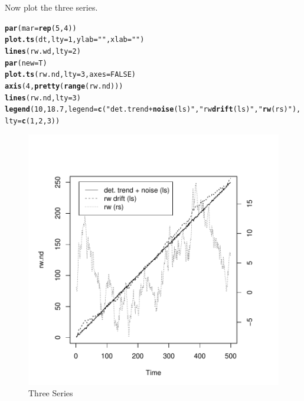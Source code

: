 \documentclass{article}\usepackage{graphicx, color}
\makeatletter
\def\maxwidth{ %
  \ifdim\Gin@nat@width>\linewidth
    \linewidth
  \else
    \Gin@nat@width
  \fi
}
\newcommand{\hlfunctioncall}[1]{\textcolor[rgb]{0.501960784313725,0,0.329411764705882}{\textbf{#1}}}%
\newcommand{\hlstring}[1]{\textcolor[rgb]{0.6,0.6,1}{#1}}%
\newenvironment{kframe}{%
 \def\at@end@of@kframe{}%
 \ifinner\ifhmode%
  \def\at@end@of@kframe{\end{minipage}}%
  \begin{minipage}{\columnwidth}%
 \fi\fi%
 \def\FrameCommand##1{\hskip\@totalleftmargin \hskip-\fboxsep
 \colorbox{shadecolor}{##1}\hskip-\fboxsep
     \hskip-\linewidth \hskip-\@totalleftmargin \hskip\columnwidth}%
 \MakeFramed {\advance\hsize-\width
   \@totalleftmargin\z@ \linewidth\hsize
   \@setminipage}}%
 {\par\unskip\endMakeFramed%
 \at@end@of@kframe}
\newenvironment{knitrout}{}{} %
\makeatother
\begin{document}
Now plot the three series. 
\begin{knitrout}
\color{fgcolor}\begin{kframe}
\begin{alltt}
\hlfunctioncall{par}(mar = \hlfunctioncall{rep}(5, 4))
\hlfunctioncall{plot.ts}(dt, lty = 1, ylab = \hlstring{""}, xlab = \hlstring{""})
\hlfunctioncall{lines}(rw.wd, lty = 2)
\hlfunctioncall{par}(new = T)
\hlfunctioncall{plot.ts}(rw.nd, lty = 3, axes = FALSE)
\hlfunctioncall{axis}(4, \hlfunctioncall{pretty}(\hlfunctioncall{range}(rw.nd)))
\hlfunctioncall{lines}(rw.nd, lty = 3)
\hlfunctioncall{legend}(10, 18.7, legend = \hlfunctioncall{c}(\hlstring{"det. trend + \hlfunctioncall{noise} (ls)"}, \hlstring{"rw \hlfunctioncall{drift} (ls)"}, \hlstring{"\hlfunctioncall{rw} (rs)"}), 
    lty = \hlfunctioncall{c}(1, 2, 3))
\end{alltt}
\end{kframe}\begin{figure}[h]

\includegraphics[width=\maxwidth]{figure/plotting} \caption[Three Series]{Three Series\label{fig:plotting}}
\end{figure}


\end{knitrout}
\end{document}
